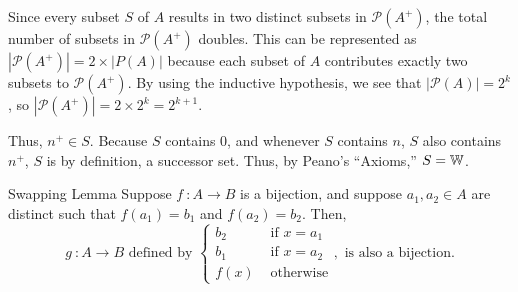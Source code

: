 {\begin{itemize}
                    Since every subset \(S\) of \(A\) results in two distinct subsets in \(\mathcal{P}(A^+)\), the total number of subsets in \(\mathcal{P}(A^+)\) doubles. This can be represented as \(|\mathcal{P}(A^+)| = 2 \times |P(A)|\) because each subset of \(A\) contributes exactly two subsets to \(\mathcal{P}(A^+)\). By using the inductive hypothesis, we see that \(|\mathcal{P}(A)| = 2^k\), so \(|\mathcal{P}(A^+)| = 2 \times 2^k = 2^{k+1}\).
                \end{itemize}
                Thus, \(n^+ \in S\). Because \(S\) contains 0, and whenever \(S\) contains \(n\), \(S\) also contains \(n^+\), \(S\) is by definition, a successor set. Thus, by Peano's ``Axioms,'' \(S = \mathbb{W}\).
            }


            \begin{exercise}
                {Swapping Lemma} Suppose \(f \ \colon A \rightarrow B\) is a bijection, and suppose \(a_1,a_2 \in A\) are distinct such that \(f(a_1) = b_1\) and \(f(a_2) = b_2\). Then, \[g \ \colon A \rightarrow B \text{ defined by } 
                \begin{cases}
                    b_2 &\text { if } x = a_1 \\
                    b_1 &\text { if } x = a_2 \\
                    f(x) &\text{ otherwise} 
                \end{cases}, \text{ is also a bijection.}\]
            \end{exercise}
    
